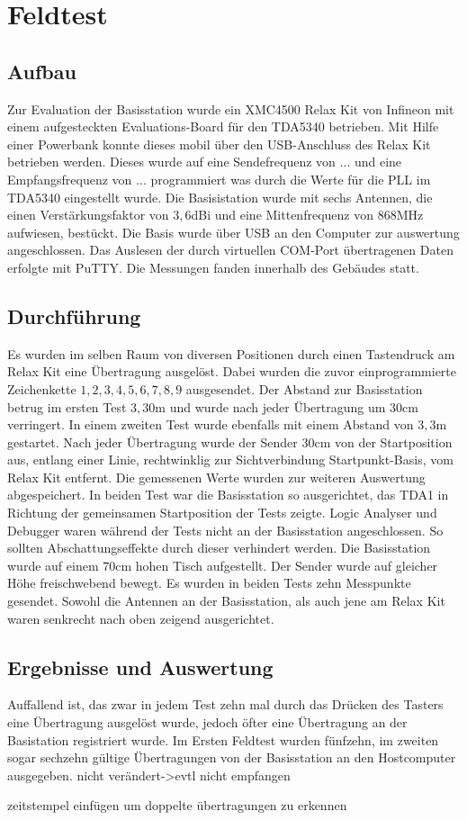 \chapter{Feldtest}
\label{sec:Feldtest}
\pagestyle{scrheadings}
\section{Aufbau}
Zur Evaluation der Basisstation wurde ein  XMC4500 Relax Kit von Infineon mit einem aufgesteckten Evaluations-Board für den TDA5340 betrieben. Mit Hilfe einer Powerbank konnte dieses mobil über den \ac{USB}-Anschluss des Relax Kit betrieben werden. %
Dieses wurde auf eine Sendefrequenz von $...$ und eine Empfangsfrequenz von $...$ programmiert was durch die Werte für die \ac{PLL} im TDA5340 eingestellt wurde. 
Die Basisistation wurde mit sechs Antennen, die einen Verstärkungsfaktor von $3,6$dBi und eine Mittenfrequenz von $868$MHz aufwiesen, bestückt. Die Basis wurde über \ac{USB} an den Computer zur auswertung angeschlossen. Das Auslesen der durch virtuellen COM-Port übertragenen Daten erfolgte mit  PuTTY. Die Messungen fanden innerhalb des Gebäudes statt.
\section{Durchführung}
Es wurden  im selben Raum von diversen Positionen durch einen Tastendruck am Relax Kit eine Übertragung ausgelöst. Dabei wurden die zuvor einprogrammierte Zeichenkette $1,2,3,4,5,6,7,8,9$ ausgesendet. Der Abstand zur Basisstation betrug im ersten Test  $3,30$m und wurde nach jeder Übertragung um $30$cm verringert. 
In einem zweiten Test wurde ebenfalls mit einem Abstand von $3,3$m gestartet.  Nach jeder Übertragung wurde der Sender $30$cm  von der Startposition aus, entlang einer  Linie, rechtwinklig zur Sichtverbindung Startpunkt-Basis, vom Relax Kit entfernt. Die gemessenen Werte wurden zur weiteren Auswertung abgespeichert.
In beiden Test war die Basisstation so ausgerichtet, das TDA1 in Richtung der gemeinsamen Startposition der Tests zeigte. Logic Analyser und Debugger waren während der Tests nicht an der Basisstation angeschlossen. So sollten Abschattungseffekte durch dieser verhindert werden. Die Basisstation wurde auf einem $70$cm hohen Tisch aufgestellt. Der Sender wurde auf gleicher Höhe freischwebend bewegt. Es wurden in beiden Tests zehn Messpunkte gesendet. Sowohl die Antennen an der Basisstation, als auch jene am Relax Kit waren senkrecht nach oben zeigend ausgerichtet.
\section{Ergebnisse und Auswertung}
Auffallend ist, das zwar in jedem Test zehn mal durch das Drücken des Tasters eine Übertragung ausgelöst wurde, jedoch öfter eine Übertragung an der Basistation registriert wurde. Im Ersten Feldtest wurden fünfzehn, im zweiten sogar sechzehn gültige Übertragungen von der Basisstation an den Hostcomputer ausgegeben. 
nicht verändert->evtl nicht empfangen

zeitstempel einfügen um doppelte übertragungen zu erkennen
